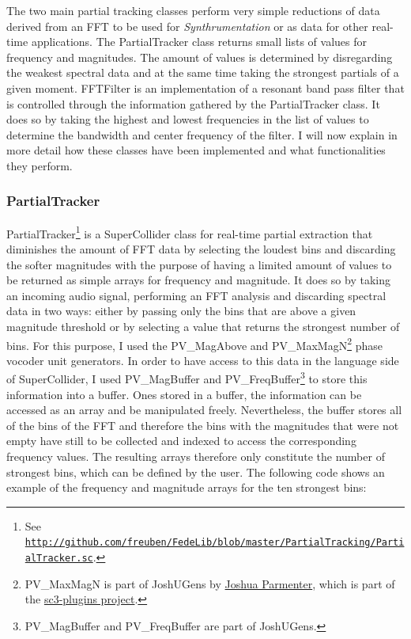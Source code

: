 The two main partial tracking classes perform very simple reductions of data derived from an FFT to be used for \emph{Synthrumentation} or as data for other real-time applications. The PartialTracker class returns small lists of values for frequency and magnitudes. The amount of values is determined by disregarding the weakest spectral data and at the same time taking the strongest partials of a given moment. FFTFilter is an implementation of a resonant band pass filter that is controlled through the information gathered by the PartialTracker class. It does so by taking the highest and lowest frequencies in the list of values to determine the bandwidth and center frequency of the filter. I will now explain in more detail how these classes have been implemented and what functionalities they perform.

\hypertarget{partrack}{}
\subsubsection{PartialTracker}

PartialTracker\footnote{See \href{http://github.com/freuben/FedeLib/blob/master/PartialTracking/PartialTracker.sc} {\texttt{http://github.com/freuben/FedeLib/blob/master/PartialTracking/PartialTracker.sc}}.} is a SuperCollider class for real-time partial extraction that diminishes the amount of FFT data by selecting the loudest bins and discarding the softer magnitudes with the purpose of having a limited amount of values to be returned as simple arrays for frequency and magnitude. It does so by taking an incoming audio signal, performing an FFT analysis and discarding spectral data in two ways: either by passing only the bins that are above a given magnitude threshold or by selecting a value that returns the strongest number of bins. For this purpose, I used the PV\_MagAbove and PV\_MaxMagN\footnote{PV\_MaxMagN is part of JoshUGens by \href{http://www.realizedsound.net/josh/}{Joshua Parmenter}, which is part of the \href{http://sourceforge.net/projects/sc3-plugins/}{sc3-plugins project}.} phase vocoder unit generators. In order to have access to this data in the language side of SuperCollider, I used PV\_MagBuffer and PV\_FreqBuffer\footnote{PV\_MagBuffer and PV\_FreqBuffer are part of JoshUGens.} to store this information into a buffer. Ones stored in a buffer, the information can be accessed as an array and be manipulated freely. Nevertheless, the buffer stores all of the bins of the FFT and therefore the bins with the magnitudes that were not empty have still to be collected and indexed to access the corresponding frequency values. The resulting arrays therefore only constitute the number of strongest bins, which can be defined by the user. The following code shows an example of the frequency and magnitude arrays for the ten strongest bins:

